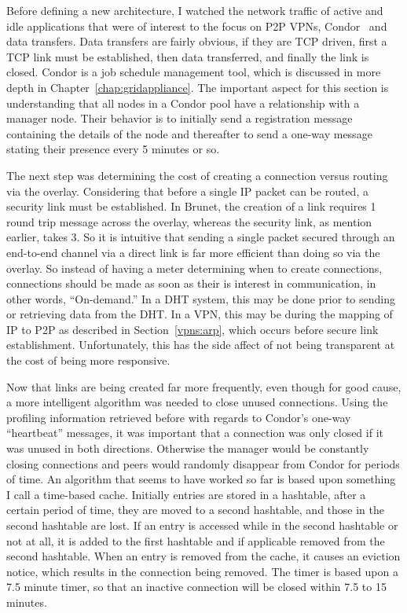 Before defining a new architecture, I watched the network traffic of active and
idle applications that were of interest to the focus on P2P VPNs,
Condor~\cite{condor0} and data transfers.  Data transfers are fairly obvious,
if they are TCP driven, first a TCP link must be established, then data
transferred, and finally the link is closed.  Condor is a job schedule
management tool, which is discussed in more depth in
Chapter~\ref{chap:gridappliance}.  The important aspect for this section is
understanding that all nodes in a Condor pool have a relationship with a
manager node.  Their behavior is to initially send a registration message
containing the details of the node and thereafter to send a one-way message
stating their presence every 5 minutes or so.

The next step was determining the cost of creating a connection versus routing
via the overlay.  Considering that before a single IP packet can be routed, a
security link must be established.  In Brunet, the creation of a link requires
1 round trip message across the overlay, whereas the security link, as mention
earlier, takes 3.  So it is intuitive that sending a single packet secured
through an end-to-end channel via a direct link is far more efficient than
doing so via the overlay.  So instead of having a meter determining when to
create connections, connections should be made as soon as their is interest in
communication, in other words, ``On-demand.''  In a DHT system, this may be done prior to sending or
retrieving data from the DHT.  In a VPN, this may be during the mapping of IP
to P2P as described in Section~\ref{vpns:arp}, which occurs before secure link
establishment.  Unfortunately, this has the side affect of not being
transparent at the cost of being more responsive.

Now that links are being created far more frequently, even though for good
cause, a more intelligent algorithm was needed to close unused connections.
Using the profiling information retrieved before with regards to Condor's
one-way ``heartbeat'' messages, it was important that a connection was only
closed if it was unused in both directions.  Otherwise the manager would be
constantly closing connections and peers would randomly disappear from Condor
for periods of time.  An algorithm that seems to have worked so far is based
upon something I call a time-based cache.  Initially entries are stored in a
hashtable, after a certain period of time, they are moved to a second
hashtable, and those in the second hashtable are lost.  If an entry is accessed
while in the second hashtable or not at all, it is added to the first hashtable
and if applicable removed from the second hashtable.  When an entry is removed
from the cache, it causes an eviction notice, which results in the connection
being removed.  The timer is based upon a 7.5 minute timer, so that an inactive
connection will be closed within 7.5 to 15 minutes.

